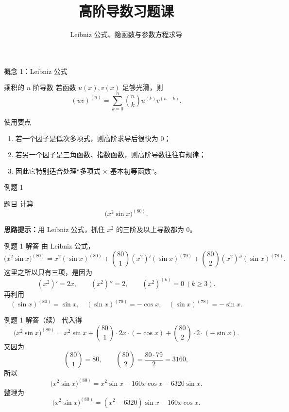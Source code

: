 ﻿\documentclass[aspectratio=169,10pt]{ctexbeamer}
\title{高阶导数习题课}
\subtitle{Leibniz 公式、隐函数与参数方程求导}
\author{}
\date{}
\begin{document}
\begin{frame}
  \titlepage
\end{frame}

\begin{frame}[t]{概念 1：Leibniz 公式}
\small
\begin{block}{乘积的 $n$ 阶导数}
若函数 $u(x),v(x)$ 足够光滑，则
\[
(uv)^{(n)}=\sum_{k=0}^n \binom{n}{k}u^{(k)}v^{(n-k)}.
\]
\end{block}

\begin{block}{使用要点}
\begin{enumerate}
  \item 若一个因子是低次多项式，则高阶求导后很快为 $0$；
  \item 若另一个因子是三角函数、指数函数，则高阶导数往往有规律；
  \item 因此它特别适合处理“多项式 $\times$ 基本初等函数”。
\end{enumerate}
\end{block}
\end{frame}

\begin{frame}[t]{例题 1}
\small
\begin{block}{题目}
计算
\[
\bigl(x^2\sin x\bigr)^{(80)}.
\]
\end{block}

\vspace{0.4em}
\textbf{思路提示：}用 Leibniz 公式，抓住 $x^2$ 的三阶及以上导数都为 $0$。
\end{frame}

\begin{frame}[t]{例题 1 解答}
\small
由 Leibniz 公式，
\[
\bigl(x^2\sin x\bigr)^{(80)}
=x^2(\sin x)^{(80)}
+\binom{80}{1}(x^2)'(\sin x)^{(79)}
+\binom{80}{2}(x^2)''(\sin x)^{(78)}.
\]
这里之所以只有三项，是因为
\[
(x^2)'=2x,\qquad (x^2)''=2,\qquad (x^2)^{(k)}=0\ (k\ge 3).
\]
再利用
\[
(\sin x)^{(80)}=\sin x,\quad
(\sin x)^{(79)}=-\cos x,\quad
(\sin x)^{(78)}=-\sin x.
\]
\end{frame}

\begin{frame}[t]{例题 1 解答（续）}
\small
代入得
\[
\bigl(x^2\sin x\bigr)^{(80)}
=x^2\sin x+\binom{80}{1}\cdot 2x\cdot(-\cos x)+\binom{80}{2}\cdot 2\cdot(-\sin x).
\]
又因为
\[
\binom{80}{1}=80,\qquad
\binom{80}{2}=\frac{80\cdot79}{2}=3160,
\]
所以
\[
\bigl(x^2\sin x\bigr)^{(80)}
=x^2\sin x-160x\cos x-6320\sin x.
\]
整理为
\[
\boxed{\bigl(x^2\sin x\bigr)^{(80)}=(x^2-6320)\sin x-160x\cos x.}
\]
\end{frame}
\end{document}
